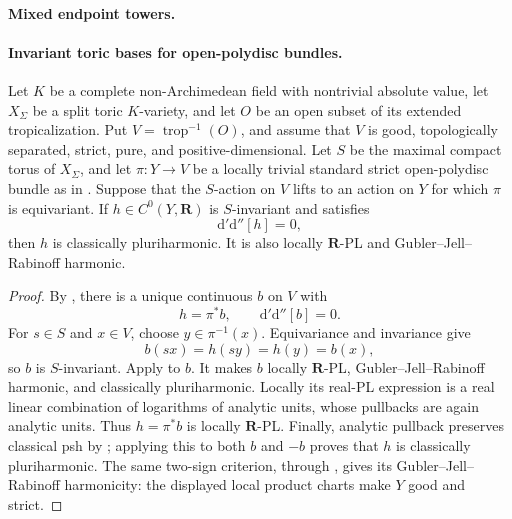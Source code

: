 \paragraph{Mixed endpoint towers.}




\paragraph{Invariant toric bases for open-polydisc bundles.}
\begin{corollary}
\label{cor:p062-invariant-toric-open-polydisc-bundles}
Let \(K\) be a complete non-Archimedean field with nontrivial absolute value,
let \(X_\Sigma\) be a split toric \(K\)-variety, and let \(O\) be an open
subset of its extended tropicalization.  Put
\(V=\operatorname{trop}^{-1}(O)\), and assume that \(V\) is good,
topologically separated, strict, pure, and positive-dimensional.  Let \(S\)
be the maximal compact torus of \(X_\Sigma\), and
let \(\pi:Y\to V\) be a locally trivial standard strict open-polydisc
bundle as in .  Suppose that
the \(S\)-action on \(V\) lifts to an action on \(Y\) for which \(\pi\) is
equivariant.  If \(h\in C^0(Y,\mathbf R)\) is \(S\)-invariant and satisfies
\[
                         \mathrm d'\mathrm d''[h]=0,
\]
then \(h\) is classically pluriharmonic.  It is also locally
\(\mathbf R\)-PL and Gubler--Jell--Rabinoff harmonic.
\end{corollary}

\begin{proof}
By , there is a unique
continuous \(b\) on \(V\) with
\[
                         h=\pi^*b,
                         \qquad \mathrm d'\mathrm d''[b]=0.
\]
For \(s\in S\) and \(x\in V\), choose \(y\in\pi^{-1}(x)\).  Equivariance and
invariance give
\[
 b(sx)=h(sy)=h(y)=b(x),
\]
so \(b\) is \(S\)-invariant.  Apply
 to
\(b\).  It makes \(b\) locally \(\mathbf R\)-PL,
Gubler--Jell--Rabinoff harmonic, and classically pluriharmonic.  Locally its
real-PL expression is a real linear combination of logarithms of analytic
units, whose pullbacks are again analytic units.  Thus \(h=\pi^*b\) is
locally \(\mathbf R\)-PL.  Finally, analytic pullback preserves classical
psh by \cite[Proposition~4.2(6)]{GR25Classical}; applying this to both \(b\)
and \(-b\) proves that \(h\) is classically pluriharmonic.  The same
two-sign criterion, through \cite[Theorem~4.3]{GR25Classical}, gives its
Gubler--Jell--Rabinoff harmonicity: the displayed local product charts make
\(Y\) good and strict.
\end{proof}

